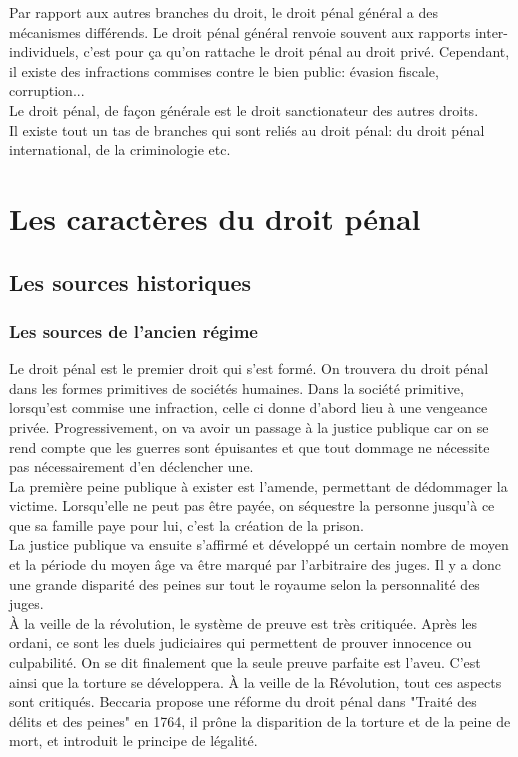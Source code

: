 \documentclass[10pt, a4paper, openany]{book}
\begin{document}
Par rapport aux autres branches du droit, le droit pénal général a des mécanismes différends. Le droit pénal général renvoie souvent aux rapports inter-individuels, c'est pour ça qu'on rattache le droit pénal au droit privé. Cependant, il existe des infractions commises contre le bien public: évasion fiscale, corruption... \\
Le droit pénal, de façon générale est le droit sanctionateur des autres droits. \\
Il existe tout un tas de branches qui sont reliés au droit pénal: du droit pénal international, de la criminologie etc.

\section{Les caractères du droit pénal}

\subsection{Les sources historiques}

\subsubsection{Les sources de l'ancien régime}

Le droit pénal est le premier droit qui s'est formé. On trouvera du droit pénal dans les formes primitives de sociétés humaines. Dans la société primitive, lorsqu'est commise une infraction, celle ci donne d'abord lieu à une vengeance privée. Progressivement, on va avoir un passage à la justice publique car on se rend compte que les guerres sont épuisantes et que tout dommage ne nécessite pas nécessairement d'en déclencher une. \\
La première peine publique à exister est l'amende, permettant de dédommager la victime. Lorsqu'elle ne peut pas être payée, on séquestre la personne jusqu'à ce que sa famille paye pour lui, c'est la création de la prison. \\
La justice publique va ensuite s'affirmé et développé un certain nombre de moyen et la période du moyen âge va être marqué par l'arbitraire des juges. Il y a donc une grande disparité des peines sur tout le royaume selon la personnalité des juges. \\
À la veille de la révolution, le système de preuve est très critiquée. Après les ordani, ce sont les duels judiciaires qui permettent de prouver innocence ou culpabilité. On se dit finalement que la seule preuve parfaite est l'aveu. C'est ainsi que la torture se développera. À la veille de la Révolution, tout ces aspects sont critiqués. Beccaria propose une réforme du droit pénal dans "Traité des délits et des peines" en 1764, il prône la disparition de la torture et de la peine de mort, et introduit le principe de légalité. 
\end{document}
